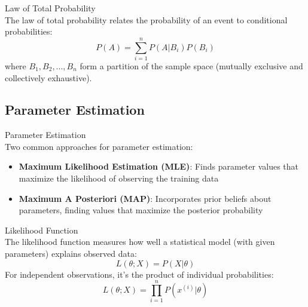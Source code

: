 \begin{concept}{Law of Total Probability}\\
The law of total probability relates the probability of an event to conditional probabilities:
\[P(A) = \sum_{i=1}^{n} P(A|B_i)P(B_i)\]
where $B_1, B_2, ..., B_n$ form a partition of the sample space (mutually exclusive and collectively exhaustive).
\end{concept}

\subsection{Parameter Estimation}

\begin{definition}{Parameter Estimation}\\
Two common approaches for parameter estimation:
\begin{itemize}
    \item \textbf{Maximum Likelihood Estimation (MLE)}: Finds parameter values that maximize the likelihood of observing the training data
    \item \textbf{Maximum A Posteriori (MAP)}: Incorporates prior beliefs about parameters, finding values that maximize the posterior probability
\end{itemize}
\end{definition}

\begin{definition}{Likelihood Function}\\
The likelihood function measures how well a statistical model (with given parameters) explains observed data:
\[L(\theta; X) = P(X|\theta)\]
For independent observations, it's the product of individual probabilities:
\[L(\theta; X) = \prod_{i=1}^{n} P(x^{(i)}|\theta)\]
\end{definition}

